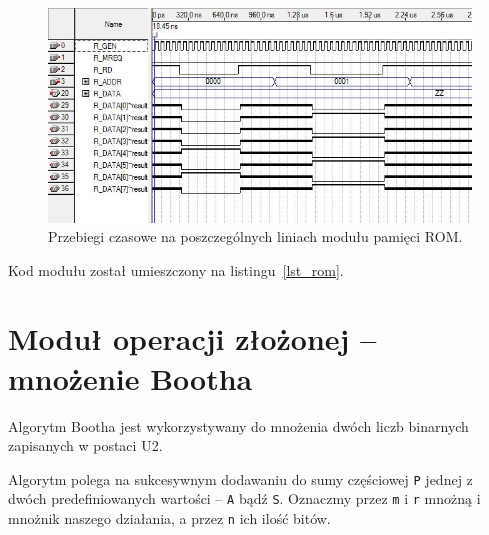 \documentclass[a4paper,12pt]{report}
\begin{document}
\begin{figure}[h]
\centering
\includegraphics[width=15cm]{./pict/rom.jpg}
\caption{Przebiegi czasowe na poszczególnych liniach modułu pamięci ROM.}
\label{fig:rom}
\end{figure}

Kod modułu został umieszczony na listingu~\ref{lst_rom}.

\section{Moduł operacji złożonej -- mnożenie Bootha}

Algorytm Bootha jest wykorzystywany do mnożenia dwóch liczb binarnych zapisanych w postaci U2.

Algorytm polega na sukcesywnym dodawaniu do sumy częściowej \texttt{P} jednej z dwóch predefiniowanych wartości -- \texttt{A} bądź \texttt{S}. Oznaczmy przez \texttt{m} i \texttt{r} mnożną i mnożnik naszego działania, a przez \texttt{n} ich ilość bitów.
\end{document}
